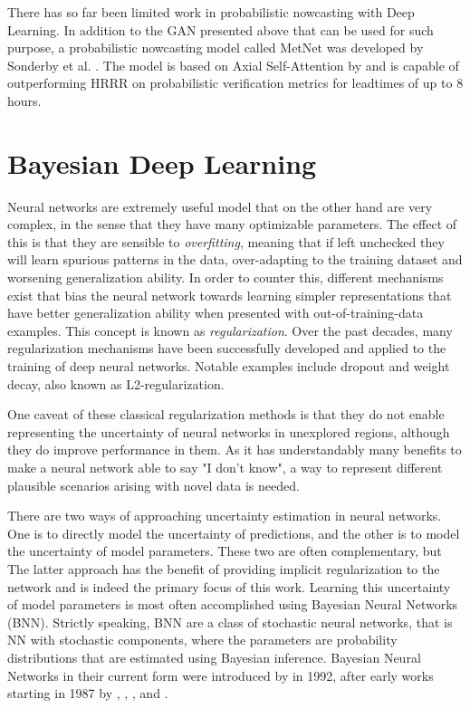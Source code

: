 There has so far been limited work in probabilistic nowcasting with Deep Learning. In addition to the GAN presented above that can be used for such purpose, a probabilistic nowcasting model called MetNet was developed by Sonderby et al. \cite{sonderby_metnet_2020}. The model is based on Axial Self-Attention by \citet{ho_axial_2019} and is capable of outperforming HRRR on probabilistic verification metrics for leadtimes of up to 8 hours. 
 
\section{Bayesian Deep Learning}
\label{section:bdl_theory}

	Neural networks are extremely useful model that on the other hand are very complex, in the sense that they have many optimizable parameters. The effect of this is that they are sensible to \textit{overfitting}, meaning that if left unchecked they will learn spurious patterns in the data, over-adapting to the training dataset and worsening generalization ability. In order to counter this, different mechanisms exist that bias the neural network towards learning simpler representations that have better generalization ability when presented with out-of-training-data examples. This concept is known as \textit{regularization}. Over the past decades, many regularization mechanisms have been successfully developed and applied to the training of deep neural networks. Notable examples include dropout and weight decay, also known as L2-regularization.  
	
	One caveat of these classical regularization methods is that they do not enable representing the uncertainty of neural networks in unexplored regions, although they do improve performance in them. As it has understandably many benefits to make a neural network able to say "I don't know", a way to represent different plausible scenarios arising with novel data is needed. 
	
	There are two ways of approaching uncertainty estimation in neural networks. One is to directly model the uncertainty of predictions, and the other is to model the uncertainty of model parameters. These two are often complementary, but The latter approach has the benefit of providing implicit regularization to the network and is indeed the primary focus of this work. Learning this uncertainty of model parameters is most often accomplished using Bayesian Neural Networks (BNN). Strictly speaking, BNN are a class of stochastic neural networks, that is NN with stochastic components, where the parameters are probability distributions that are estimated using Bayesian inference. Bayesian Neural Networks in their current form were introduced by \citet{mackay1992practical} in 1992, after early works starting in 1987 by \citet{denker1987large}, \citet{tishby_consistent_1989}, \citet{denker_transforming_1990}, and \citet{buntine1991bayesian}. 
	
